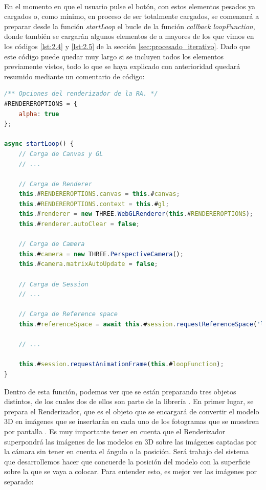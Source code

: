 \documentclass{subfiles}
\begin{document}
        \paragraph{}
        En el momento en que el usuario pulse el botón, con estos elementos pesados ya cargados o, como mínimo, en proceso de ser totalmente cargados, se comenzará a preparar desde la función \textit{startLoop} el bucle de la función \textit{callback loopFunction}, donde también se cargarán algunos elementos de \threejs a mayores de los que vimos en los códigos \ref{lst:2.4} y \ref{lst:2.5} de la sección \ref{sec:procesado_iterativo}. Dado que este código puede quedar muy largo si se incluyen todos los elementos previamente vistos, todo lo que se haya explicado con anterioridad quedará resumido mediante un comentario de código:

\begin{lstlisting}[language=JavaScript, caption={Carga de elementos de Three.js antes de lanzar el bucle.}, label={lst:3.2}]
/** Opciones del renderizador de la RA. */
#RENDEREROPTIONS = {
    alpha: true
};

async startLoop() {
    // Carga de Canvas y GL
    // ...

    // Carga de Renderer
    this.#RENDEREROPTIONS.canvas = this.#canvas;
    this.#RENDEREROPTIONS.context = this.#gl;
    this.#renderer = new THREE.WebGLRenderer(this.#RENDEREROPTIONS);
    this.#renderer.autoClear = false;

    // Carga de Camera
    this.#camera = new THREE.PerspectiveCamera();
    this.#camera.matrixAutoUpdate = false;

    // Carga de Session
    // ...

    // Carga de Reference space
    this.#referenceSpace = await this.#session.requestReferenceSpace('local');

    // ...

    this.#session.requestAnimationFrame(this.#loopFunction);
}
\end{lstlisting}

        Dentro de esta función, podemos ver que se están preparando tres objetos distintos, de los cuales dos de ellos son parte de la librería \threejs. En primer lugar, se prepara el Renderizador, que es el objeto que se encargará de convertir el modelo 3D en imágenes que se insertarán en cada uno de los fotogramas que se muestren por pantalla \cite{web:threejs_webglrenderer}. Es muy importante tener en cuenta que el Renderizador superpondrá las imágenes de los modelos en 3D sobre las imágenes captadas por la cámara sin tener en cuenta el ángulo o la posición. Será trabajo del sistema que desarrollemos hacer que concuerde la posición del modelo con la superficie sobre la que se vaya a colocar. Para entender esto, es mejor ver las imágenes por separado:
\end{document}
